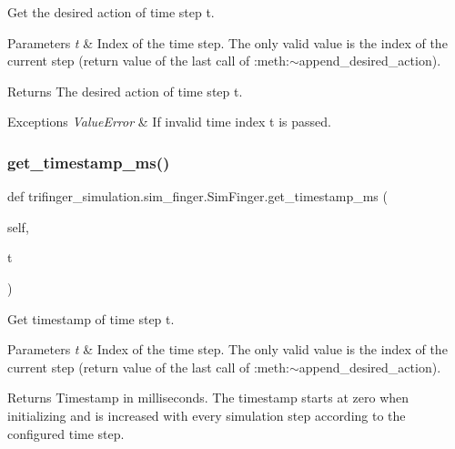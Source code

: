 Get the desired action of time step \textquotesingle{}t\textquotesingle{}. 


\begin{DoxyParams}{Parameters}
{\em t} & Index of the time step. The only valid value is the index of the current step (return value of the last call of \+:meth\+:{\ttfamily $\sim$append\+\_\+desired\+\_\+action}).\\
\hline
\end{DoxyParams}
\begin{DoxyReturn}{Returns}
The desired action of time step t.
\end{DoxyReturn}

\begin{DoxyExceptions}{Exceptions}
{\em Value\+Error} & If invalid time index {\ttfamily t} is passed. \\
\hline
\end{DoxyExceptions}
\mbox{\label{classtrifinger__simulation_1_1sim__finger_1_1SimFinger_a7836fb9b5deacefa636afcea7b9639d7}} 
\subsubsection{\texorpdfstring{get\+\_\+timestamp\+\_\+ms()}{get\_timestamp\_ms()}}
{\footnotesize\ttfamily def trifinger\+\_\+simulation.\+sim\+\_\+finger.\+Sim\+Finger.\+get\+\_\+timestamp\+\_\+ms (\begin{DoxyParamCaption}\item[{}]{self,  }\item[{}]{t }\end{DoxyParamCaption})}



Get timestamp of time step \textquotesingle{}t\textquotesingle{}. 


\begin{DoxyParams}{Parameters}
{\em t} & Index of the time step. The only valid value is the index of the current step (return value of the last call of \+:meth\+:{\ttfamily $\sim$append\+\_\+desired\+\_\+action}).\\
\hline
\end{DoxyParams}
\begin{DoxyReturn}{Returns}
Timestamp in milliseconds. The timestamp starts at zero when initializing and is increased with every simulation step according to the configured time step.
\end{DoxyReturn}

